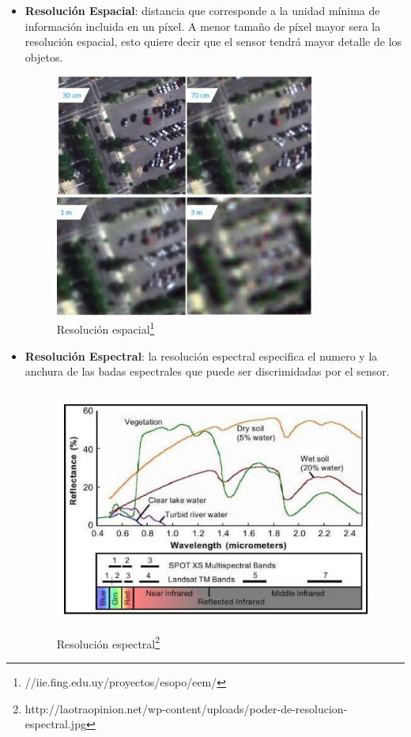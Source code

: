 \begin{itemize}
\item \textbf{Resolución Espacial}: distancia que corresponde a la unidad mínima de información incluida en un píxel. A menor tamaño de píxel mayor sera la resolución espacial, esto quiere decir que el sensor tendrá mayor detalle de los objetos.

\begin{figure}[H] \centering
  \includegraphics[height=8cm,keepaspectratio=true,clip=true]{imagenes/MarcoTeorico/resolucion.png}
  \caption[Resolución espacial]{Resolución espacial\footnote{//iie.fing.edu.uy/proyectos/esopo/eem/}} \label{Fig:resolucion-esp}
\end{figure}

\item \textbf{Resolución Espectral}: la resolución espectral especifica el numero y la anchura de las badas espectrales que puede ser discrimidadas por el sensor.
\begin{figure}[H] \centering
  \includegraphics[height=8cm,keepaspectratio=true,clip=true]{imagenes/MarcoTeorico/resolucion_espectral.jpg}
  \caption[Resolución espectral]{Resolución espectral\footnote{http://laotraopinion.net/wp-content/uploads/poder-de-resolucion-espectral.jpg}}\label{Fig:resolucion-espectral}
\end{figure}


\end{itemize}

